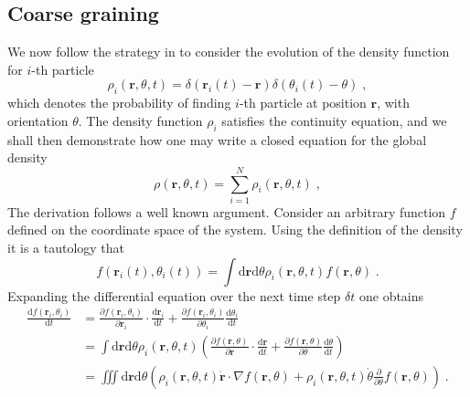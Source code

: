 \documentclass{article}
\begin{document}
\subsection{Coarse graining}
We now follow the strategy in \cite{DavidSDean_1996} to consider the evolution of the density function for $i$-th particle
\begin{equation}
    \rho _i\left( \mathbf{r},\theta ,t \right) =\delta \left( \mathbf{r}_i\left( t \right) -\mathbf{r} \right) \delta \left( \theta _i\left( t \right) -\theta \right) \;, 
\end{equation}
which denotes the probability of finding $i$-th particle at position $\mathbf{r}$, with orientation $\theta$. The density function $\rho _i$ satisfies the continuity equation, and we shall then demonstrate how one may write a closed equation for the global density
\begin{equation}
    \rho \left( \mathbf{r},\theta ,t \right) =\sum_{i=1}^N{\rho _i\left( \mathbf{r},\theta ,t \right)}\;,
    \label{eq:coarseDensitySub2}
\end{equation}
The derivation follows a well known argument. Consider an arbitrary function $f$ defined on the coordinate space of the system. Using the definition of the density it is a tautology
that
\begin{equation}
    \label{eq:arbitraryFunction}
    f\left( \mathbf{r}_i\left( t \right) ,\theta _i\left( t \right) \right) =\int{\mathrm{d}\mathbf{r}\mathrm{d}\theta \rho _i\left( \mathbf{r},\theta ,t \right) f\left( \mathbf{r},\theta \right)}\;.
\end{equation}
Expanding the differential equation over the next time step $\delta t$ one obtains
\begin{equation}
    \begin{aligned}
        \frac{\mathrm{d}f\left( \mathbf{r}_i,\theta _i \right)}{\mathrm{d}t}&=\frac{\partial f\left( \mathbf{r}_i,\theta _i \right)}{\partial \mathbf{r}_i}\cdot \frac{\mathrm{d}\mathbf{r}_i}{\mathrm{d}t}+\frac{\partial f\left( \mathbf{r}_i,\theta _i \right)}{\partial \theta _i}\frac{\mathrm{d}\theta _i}{\mathrm{d}t}\\
        &=\int{\mathrm{d}\mathbf{r}\mathrm{d}\theta \rho _i\left( \mathbf{r},\theta ,t \right) \left( \frac{\partial f\left( \mathbf{r},\theta \right)}{\partial \mathbf{r}}\cdot \frac{\mathrm{d}\mathbf{r}}{\mathrm{d}t}+\frac{\partial f\left( \mathbf{r},\theta \right)}{\partial \theta}\frac{\mathrm{d}\theta}{\mathrm{d}t} \right)}\\
        &=\iiint{\mathrm{d}\mathbf{r}\mathrm{d}\theta \left( \rho _i\left( \mathbf{r},\theta ,t \right) \dot{\mathbf{r}}\cdot \nabla f\left( \mathbf{r},\theta \right) +\rho _i\left( \mathbf{r},\theta ,t \right) \dot{\theta}\frac{\partial}{\partial \theta}f\left( \mathbf{r},\theta \right) \right) \;.}\\
    \end{aligned}
\end{equation}
\end{document}
